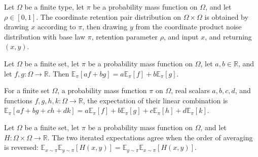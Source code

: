 \begin{definition}
\label{FABL.productRetentionCoordinatePairPMF}
\leanok
{}
Let $\Omega$ be a finite type, let $\pi$ be a probability mass function on $\Omega$, and
let $\rho\in[0,1]$. The coordinate retention pair distribution on $\Omega\times\Omega$
is obtained by drawing $x$ according to $\pi$, then drawing $y$ from the coordinate
product noise distribution with base law $\pi$, retention parameter $\rho$, and input
$x$, and returning $(x,y)$.
\end{definition}

\begin{theorem}
\label{FABL.pmfExpectation_two_linear}
\leanok
{}
Let $\Omega$ be a finite set, let $\pi$ be a probability mass function on $\Omega$, let
$a,b\in\mathbb{R}$, and let $f,g:\Omega\to\mathbb{R}$. Then
$\mathbb{E}_{\pi}[af+bg]=a\mathbb{E}_{\pi}[f]+b\mathbb{E}_{\pi}[g]$.
\end{theorem}

\begin{theorem}
\label{FABL.pmfExpectation_four_linear}
\leanok
{}
For a finite set $\Omega$, a probability mass function $\pi$ on $\Omega$, real scalars
$a,b,c,d$, and functions $f,g,h,k:\Omega\to\mathbb{R}$, the expectation of their linear
combination is
$\mathbb{E}_{\pi}[af+bg+ch+dk]=a\mathbb{E}_{\pi}[f]+b\mathbb{E}_{\pi}[g]+c\mathbb{E}_{\pi}[h]+d\mathbb{E}_{\pi}[k]$.
\end{theorem}

\begin{theorem}
\label{FABL.pmfExpectation_swap}
\leanok
{}
Let $\Omega$ be a finite set, let $\pi$ be a probability mass function on $\Omega$, and
let $H:\Omega\times\Omega\to\mathbb{R}$. The two iterated expectations agree when the
order of averaging is reversed:
$\mathbb{E}_{x\sim\pi}\mathbb{E}_{y\sim\pi}[H(x,y)]=\mathbb{E}_{y\sim\pi}\mathbb{E}_{x\sim\pi}[H(x,y)]$.
\end{theorem}

